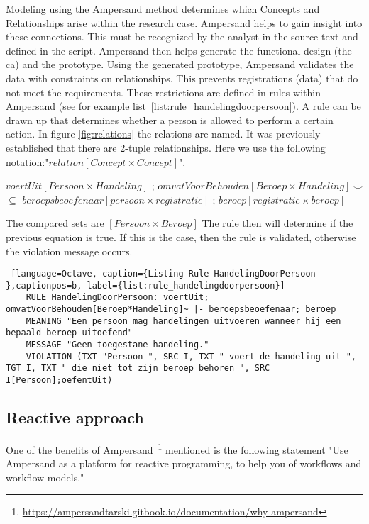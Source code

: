 Modeling using the Ampersand method determines which Concepts and Relationships arise within the research case.
Ampersand helps to gain insight into these connections.
This must be recognized by the analyst in the source text and defined in the script.
Ampersand then helps generate the functional design (the \acrshort{ca}) and the prototype.
Using the generated prototype, Ampersand validates the data with constraints on relationships.
This prevents registrations (data) that do not meet the requirements.
These restrictions are defined in rules within Ampersand (see for example list~\ref{list:rule_handelingdoorpersoon}).
A rule can be drawn up that determines whether a person is allowed to perform a certain action.
In figure \ref{fig:relations} the relations are named.
It was previously established that there are 2-tuple relationships.
Here we use the following notation:"$\mathit{relation [Concept \times Concept]}$".
\begin{center}
$\mathit{voertUit [Persoon \times Handeling]}$ ; 
 $\mathit{omvatVoorBehouden [Beroep \times Handeling]~\smallsmile}$
\newline $\subseteq$
\newline $\mathit{beroepsbeoefenaar [persoon \times registratie]}$ ;
$\mathit{beroep [registratie \times beroep]}$
\end{center}
The compared sets are
\newline $\mathit{[Persoon \times Beroep]}$
\newline The rule then will determine if the previous equation is true.
\newline If this is the case, then the rule is validated, otherwise the violation message occurs.
\begin{lstlisting} [language=Octave, caption={Listing Rule HandelingDoorPersoon },captionpos=b, label={list:rule_handelingdoorpersoon}] 
    RULE HandelingDoorPersoon: voertUit; omvatVoorBehouden[Beroep*Handeling]~ |- beroepsbeoefenaar; beroep
    MEANING "Een persoon mag handelingen uitvoeren wanneer hij een bepaald beroep uitoefend"
    MESSAGE "Geen toegestane handeling."
    VIOLATION (TXT "Persoon ", SRC I, TXT " voert de handeling uit ", TGT I, TXT " die niet tot zijn beroep behoren ", SRC I[Persoon];oefentUit)
\end{lstlisting}


\subsection{Reactive approach} \label{reactive_approach}
One of the benefits of Ampersand~\footnote{\url{https://ampersandtarski.gitbook.io/documentation/why-ampersand}} mentioned is the following statement "Use Ampersand as a platform for reactive programming, to help you of workflows and workflow models."

